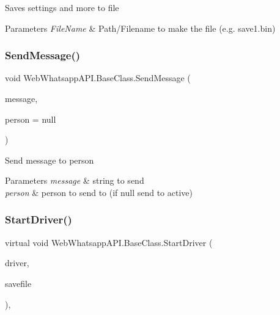 Saves settings and more to file 


\begin{DoxyParams}{Parameters}
{\em File\+Name} & Path/\+Filename to make the file (e.\+g. save1.\+bin)\\
\hline
\end{DoxyParams}
\mbox{\label{class_web_whatsapp_a_p_i_1_1_base_class_a394d26a4172531e8149b5e084917dc99}} 
\subsubsection{\texorpdfstring{Send\+Message()}{SendMessage()}}
{\footnotesize\ttfamily void Web\+Whatsapp\+A\+P\+I.\+Base\+Class.\+Send\+Message (\begin{DoxyParamCaption}\item[{string}]{message,  }\item[{string}]{person = {\ttfamily null} }\end{DoxyParamCaption})\hspace{0.3cm}{\ttfamily [inline]}}



Send message to person 


\begin{DoxyParams}{Parameters}
{\em message} & string to send\\
\hline
{\em person} & person to send to (if null send to active)\\
\hline
\end{DoxyParams}
\mbox{\label{class_web_whatsapp_a_p_i_1_1_base_class_aaa7e5947e31c9f475c95c9818f6c3a00}} 
\subsubsection{\texorpdfstring{Start\+Driver()}{StartDriver()}\hspace{0.1cm}{\footnotesize\ttfamily [1/3]}}
{\footnotesize\ttfamily virtual void Web\+Whatsapp\+A\+P\+I.\+Base\+Class.\+Start\+Driver (\begin{DoxyParamCaption}\item[{I\+Web\+Driver}]{driver,  }\item[{string}]{savefile }\end{DoxyParamCaption})\hspace{0.3cm}{\ttfamily [inline]}, {\ttfamily [virtual]}}



